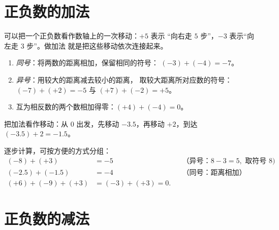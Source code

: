 \section{正负数的加法}

可以把一个正负数看作数轴上的一次移动：$+5$ 表示
“向右走 $5$ 步”，$-3$ 表示“向左走 $3$ 步”。做加法
就是把这些移动依次连接起来。

\begin{method}[两个正负数相加]\label{met:g7:negatives:add}
\begin{enumerate}
  \item \emph{同号}：将两数的距离相加，保留相同的符号：
        $(-3) + (-4) = -7$。
  \item \emph{异号}：用较大的距离减去较小的距离，
        取较大距离所对应数的符号：
        $(-7) + (+2) = -5$ 与 $(+7) + (-2) = +5$。
  \item 互为相反数的两个数相加得零：$(+4) + (-4) = 0$。
\end{enumerate}
\end{method}

\begin{omfigure}

{\small 把加法看作移动：从 $0$ 出发，先移动 $-3.5$，再移动
$+2$，到达 $(-3.5) + 2 = -1.5$。}
\end{omfigure}

\begin{example}\label{ex:g7:negatives:add}
逐步计算，可按方便的方式分组：
\begin{align*}
(-8) + (+3) &= -5 && \text{（异号：} 8 - 3 = 5,
\text{ 取符号 } 8)\\
(-2.5) + (-1.5) &= -4 && \text{（同号：距离相加）}\\
(+6) + (-9) + (+3) &= (-3) + (+3) = 0 .
\end{align*}
\end{example}

\section{正负数的减法}

